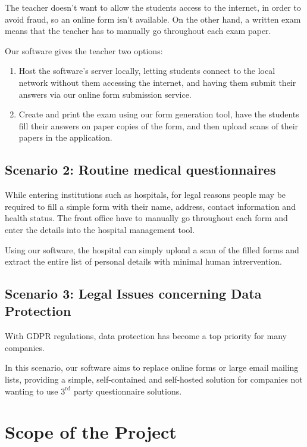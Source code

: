 \documentclass[12pt, a4paper]{report}
\begin{document}
The teacher doesn't want to allow the students access to the internet, in order to avoid fraud, so an online form isn't available. On the other hand, a written exam means that the teacher has to manually go throughout each exam paper.

Our software gives the teacher two options:
\begin{enumerate}
    \item Host the software's server locally, letting students connect to the local network without them accessing the internet, and having them submit their answers via our online form submission service.
    \item Create and print the exam using our form generation tool, have the students fill their answers on paper copies of the form, and then upload scans of their papers in the application. 
\end{enumerate}

\subsection*{Scenario 2: Routine medical questionnaires}

While entering institutions such as hospitals, for legal reasons people may be required to fill a simple form with their name, address, contact information and health status.
The front office have to manually go throughout each form and enter the details into the hospital management tool.

Using our software, the hospital can simply upload a scan of the filled forms and extract the entire list of personal details with minimal human intrervention.

\subsection*{Scenario 3:  Legal Issues concerning Data Protection}

With GDPR regulations, data protection has become a top priority for many companies.

In this scenario, our software aims to replace online forms or large email mailing lists, providing a simple, self-contained and self-hosted solution for companies not wanting to use $3^\textrm{rd}$ party questionnaire solutions.

\section{Scope of the Project}
\end{document}
